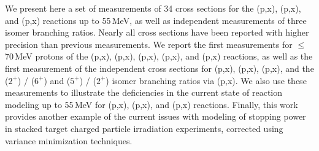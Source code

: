 We present here a set of measurements of 34 cross sections for the (p,x), (p,x), and  (p,x) reactions up to 55\,MeV, as well as  independent measurements of three isomer branching ratios.
Nearly all cross sections have been reported with higher precision than previous measurements.
We report the first measurements  for $\leq$70\,MeV protons  of the  (p,x), (p,x), (p,x),  (p,x), and (p,x) reactions, as well as the first measurement of the independent cross sections for    (p,x), (p,x), (p,x), and the  ($2^+$) /   ($6^+$) and  ($5^+$) /   ($2^+$)  isomer branching ratios via (p,x).
We also use these measurements to illustrate the deficiencies in the current state of  reaction modeling up to 55\,MeV for  (p,x), (p,x), and  (p,x) reactions.
Finally, this work provides another example of the current issues with modeling of  stopping power in stacked target charged particle irradiation experiments, corrected using variance minimization techniques.  



